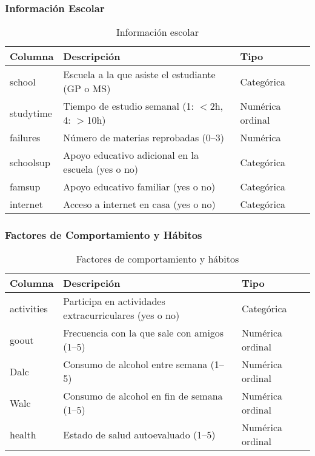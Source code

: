 \documentclass{article}
\begin{document}
\subsubsection*{Información Escolar}

\begin{table}[H]
\centering
\begin{tabular}{|l|p{8cm}|l|}
\hline
\textbf{Columna} & \textbf{Descripción}                                                   & \textbf{Tipo} \\ \hline
school           & Escuela a la que asiste el estudiante (GP o MS)                        & Categórica    \\ \hline
studytime        & Tiempo de estudio semanal (1: $<$2h, 4: $>$10h)                       & Numérica ordinal \\ \hline
failures         & Número de materias reprobadas (0–3)                                   & Numérica     \\ \hline
schoolsup        & Apoyo educativo adicional en la escuela (yes o no)                    & Categórica    \\ \hline
famsup           & Apoyo educativo familiar (yes o no)                                   & Categórica    \\ \hline
internet         & Acceso a internet en casa (yes o no)                                  & Categórica    \\ \hline
\end{tabular}
\caption{Información escolar}
\label{tab:informacion_escolar}
\end{table}

\subsubsection*{Factores de Comportamiento y Hábitos}

\begin{table}[H]
\centering
\begin{tabular}{|l|p{8cm}|l|}
\hline
\textbf{Columna} & \textbf{Descripción}                                                 & \textbf{Tipo} \\ \hline
activities       & Participa en actividades extracurriculares (yes o no)                & Categórica    \\ \hline
goout            & Frecuencia con la que sale con amigos (1–5)                         & Numérica ordinal \\ \hline
Dalc             & Consumo de alcohol entre semana (1–5)                               & Numérica ordinal \\ \hline
Walc             & Consumo de alcohol en fin de semana (1–5)                           & Numérica ordinal \\ \hline
health           & Estado de salud autoevaluado (1–5)                                  & Numérica ordinal \\ \hline
\end{tabular}
\caption{Factores de comportamiento y hábitos}
\label{tab:factores_comportamiento}
\end{table}
\end{document}
